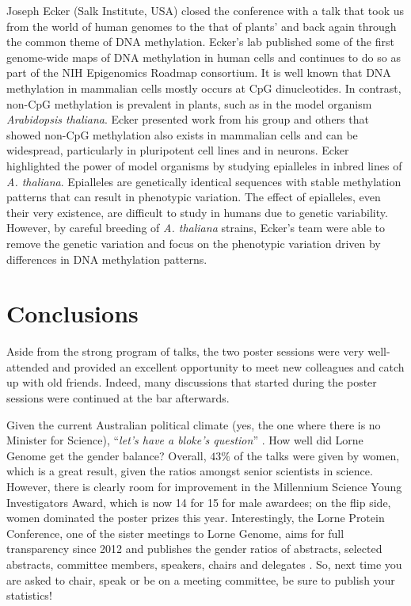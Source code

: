\documentclass[twocolumn]{bmcart}%
\begin{document}
Joseph Ecker (Salk Institute, USA) closed the conference with a talk that took us from the world of human genomes to the that of plants' and back again through the common theme of DNA methylation. Ecker's lab published some of the first genome-wide maps of DNA methylation in human cells and continues to do so as part of the NIH Epigenomics Roadmap consortium. It is well known that DNA methylation in mammalian cells mostly occurs at CpG dinucleotides.  In contrast, non-CpG methylation is prevalent in plants, such as in the model organism \emph{Arabidopsis thaliana}. Ecker presented work from his group and others that showed non-CpG methylation also exists in mammalian cells and can be widespread, particularly in pluripotent cell lines and in neurons. Ecker highlighted the power of model organisms by studying epialleles in inbred lines of \emph{A. thaliana}. Epialleles are genetically identical sequences with stable methylation patterns that can result in phenotypic variation. The effect of epialleles, even their very existence, are difficult to study in humans due to genetic variability. However, by careful breeding of \emph{A. thaliana} strains, Ecker's team were able to remove the genetic variation and focus on the phenotypic variation driven by differences in DNA methylation patterns.

\section*{Conclusions}
Aside from the strong program of talks, the two poster sessions were very well-attended and provided an excellent opportunity to meet new colleagues and catch up with old friends. Indeed, many discussions that started during the poster sessions were continued at the bar afterwards. 

Given the current Australian political climate (yes, the one where there is no Minister for Science), ``{\em let's have a bloke's question}'' \cite{INDEPENDENT}.  How well did Lorne Genome get the gender balance?  Overall, $43\%$ of the talks were given by women, which is a great result, given the ratios amongst senior scientists in science.  However, there is clearly room for improvement in the Millennium Science Young Investigators Award, which is now 14 for 15 for male awardees; on the flip side, women dominated the poster prizes this year.  Interestingly, the Lorne Protein Conference, one of the sister meetings to Lorne Genome, aims for full transparency since 2012 and publishes the gender ratios of abstracts, selected abstracts, committee members, speakers, chairs and delegates \cite{LORNEPROTEIN}.  So, next time you are asked to chair, speak or be on a meeting committee, be sure to publish your statistics!
\end{document}
